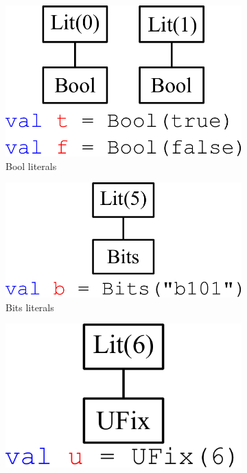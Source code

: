 \begin{figure}[b]
\centering
  \begin{subfigure}[t]{0.22\textwidth}
  \centering
  \includegraphics[width=\textwidth]{figures/bool.pdf}
  \caption{Bool literals}
  \label{fig:bool}
  \end{subfigure}
  \hfill
  \begin{subfigure}[t]{0.28\textwidth}
  \centering
  \includegraphics[width=\textwidth]{figures/bits.pdf}
  \caption{Bits literals}
  \label{fig:bits}
  \end{subfigure}
  \hfill
  \begin{subfigure}[t]{0.22\textwidth}
  \centering
  \includegraphics[width=\textwidth]{figures/ufix.pdf}

\end{subfigure}
\end{figure}
